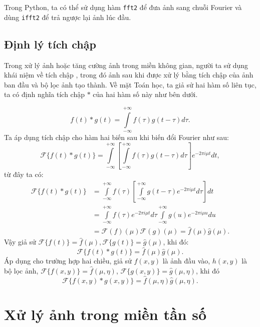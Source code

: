 \documentclass[12pt,a4paper]{report}
\numberwithin{equation}{section}
\theoremstyle{definition} %
\begin{document}
Trong Python, ta có thể sử dụng hàm \texttt{fft2} để đưa ảnh sang chuỗi Fourier và dùng \texttt{ifft2} để trả ngược lại ảnh lúc đầu.
\subsection{Định lý tích chập}
Trong xử lý ảnh hoặc tăng cường ảnh trong miền không gian, người ta sử dụng khái niệm về tích chập , trong đó ảnh sau khi được xử lý bằng tích chập của ảnh ban đầu và bộ lọc ảnh tạo thành. Về mặt Toán học, ta giả sử hai hàm số liên tục, ta có định nghĩa tích chập $*$ của hai hàm số này như bên dưới.

\begin{equation}
	\label{1322}
f(t) \ast g(t) = \int\limits_{-\infty}^{+\infty}f(\tau)g(t -\tau)d\tau.
\end{equation}
Ta áp dụng tích chập cho hàm hai biến sau khi biến đổi Fourier như sau: 
\begin{equation}
\label{1323}
\mathcal{F}\{f(t)\ast g(t)\} = \int\limits_{-\infty}^{+\infty}\left[\int\limits_{-\infty}^{+\infty}f(\tau)g(t-\tau)d\tau\right]e^{-2\pi i\mu t}dt,
\end{equation}
từ đây ta có: 
\begin{align*}
\mathcal{F}\{f(t)\ast g(t)\} &= \int\limits_{-\infty}^{+\infty}f(\tau)\left[\int\limits_{-\infty}^{+\infty}g(t-\tau)e^{-2\pi i\mu t}d\tau\right]dt\\
&=\int\limits_{-\infty}^{+\infty}f(\tau)e^{-2\pi i \mu t}d\tau\int\limits_{-\infty}^{+\infty}g(u)e^{-2\pi i\mu u}du\\
&=\mathcal{F}(f)(\mu)\mathcal{F}(g)(\mu)=\hat{f}(\mu)\hat{g}(\mu).
\end{align*}
Vậy giả sử $\mathcal{F}\{f(t)\} = \hat{f}(\mu), \mathcal{F}\{g(t)\} = \hat{g}(\mu)$, khi đó: 
\begin{equation}
\mathcal{F}\{f(t)\ast g(t)\} = \hat{f}(\mu)\hat{g}(\mu).
\end{equation}
Áp dụng cho trường hợp hai chiều, giả sử $f(x,y)$ là ảnh đầu vào, $h(x,y)$ là bộ lọc ảnh, $\mathcal{F}\{f(x,y)\}=\hat{f}(\mu,\eta)$, $\mathcal{F}\{g(x,y)\} = \hat{g}(\mu,\eta)$, khi đó
\begin{equation}
\mathcal{F}\{f(x,y)\ast g(x,y)\} = \hat{f}(\mu,\eta)\hat{g}(\mu,\eta).
\end{equation}

\section{Xử lý ảnh trong miền tần số}
\end{document}
